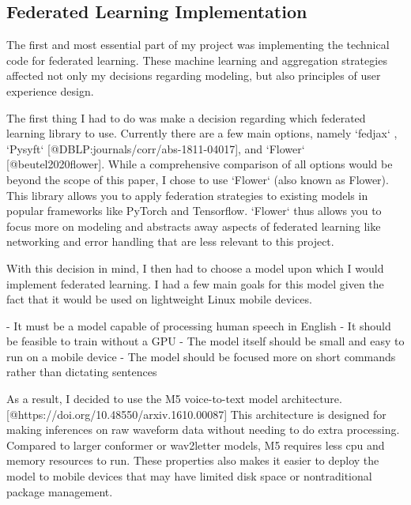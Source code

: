 \documentclass[manuscript,screen,review]{acmart}
\begin{document}
\subsection{Federated Learning Implementation}

The first and most essential part of my project was implementing the technical code for federated learning. These machine learning and aggregation strategies affected not only my decisions regarding modeling, but also principles of user experience design.

The first thing I had to do was make a decision regarding which federated learning library to use. Currently there are a few main options, namely `fedjax` , `Pysyft` [@DBLP:journals/corr/abs-1811-04017], and `Flower` [@beutel2020flower]. While a comprehensive comparison of all options would be beyond the scope of this paper, I chose to use `Flower` (also known as Flower). This library allows you to apply federation strategies to existing models in popular frameworks like PyTorch and Tensorflow. `Flower` thus allows you to focus more on modeling and abstracts away aspects of federated learning like networking and error handling that are less relevant to this project.

With this decision in mind, I then had to choose a model upon which I would implement federated learning. I had a few main goals for this model given the fact that it would be used on lightweight Linux mobile devices.

- It must be a model capable of processing human speech in English
- It should be feasible to train without a GPU
- The model itself should be small and easy to run on a mobile device
- The model should be focused more on short commands rather than dictating sentences

As a result, I decided to use the M5 voice-to-text model architecture. [@https://doi.org/10.48550/arxiv.1610.00087] This architecture is designed for making inferences on raw waveform data without needing to do extra processing. Compared to larger conformer or wav2letter models, M5 requires less cpu and memory resources to run. These properties also makes it easier to deploy the model to mobile devices that may have limited disk space or nontraditional package management.
\end{document}
